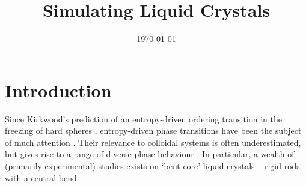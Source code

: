 \documentclass[11pt, a4paper]{article} %
\title{Simulating Liquid Crystals}
\author{\authorstyle{Candidate 8277T} 
	\institution{Supervisors: Prof Erika Eiser, Mr Jiaming Yu}}
\date{\today} %
\begin{document}
	




\tableofcontents %
\newpage





\section{Introduction}

Since Kirkwood's prediction of an entropy-driven ordering transition in the freezing of hard spheres \cite{Kirkwood1954}, entropy-driven phase transitions have been the subject of much attention \cite{Kerr1993,Frenkel1999}. Their relevance to colloidal systems is often underestimated, but gives rise to a range of diverse phase behaviour \cite{Adams1998, Anderson2002, Forsyth1978}. In particular, a wealth of (primarily experimental) studies exists on `bent-core' liquid crystals -- rigid rods with a central bend \cite{Takezoe2006, Etxebarria2008, Yang2018}.
\end{document}
